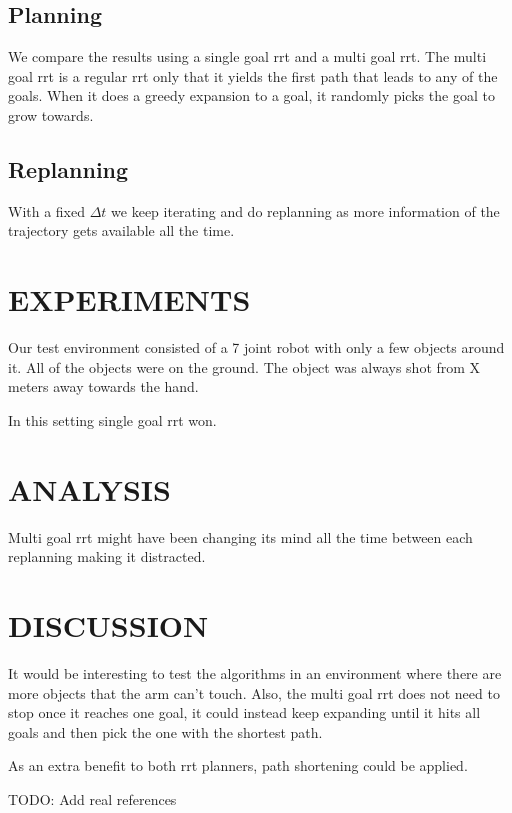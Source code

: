 \documentclass[letterpaper, 10 pt, conference]{ieeeconf}  %
\begin{document}
\subsection{Planning}

We compare the results using a single goal rrt and a multi goal rrt. The multi
goal rrt is a regular rrt only that it yields the first path that leads to any
of the goals. When it does a greedy expansion to a goal, it randomly picks the
goal to grow towards.

\subsection{Replanning}

With a fixed $\Delta t$ we keep iterating and do replanning as more information
of the trajectory gets available all the time.

\section{EXPERIMENTS}

Our test environment consisted of a 7 joint robot with only a few objects around it. All of the objects were on the ground. The object was always shot from X meters away towards the hand.

In this setting single goal rrt won.

\section{ANALYSIS}

Multi goal rrt might have been changing its mind all the time between each replanning making it distracted.

\section{DISCUSSION}

It would be interesting to test the algorithms in an environment where there
are more objects that the arm can't touch. Also, the multi goal rrt does not
need to stop once it reaches one goal, it could instead keep expanding until it
hits all goals and then pick the one with the shortest path.

As an extra benefit to both rrt planners, path shortening could be applied.

\begin{thebibliography}{99}

 TODO: Add real references

\end{thebibliography}
\end{document}
